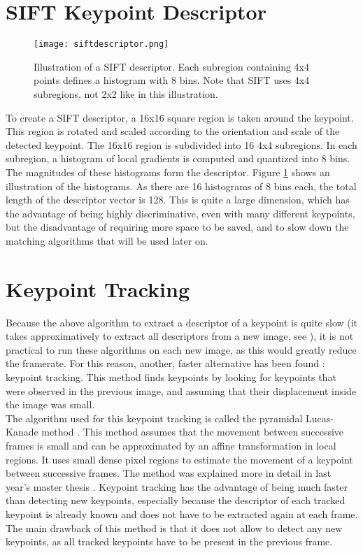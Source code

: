 \section{SIFT Keypoint Descriptor}
\begin{figure}[H]
  \centering
  \texttt{[image: siftdescriptor.png]}
    \caption{Illustration of a SIFT descriptor. Each subregion containing 4x4 points defines a histogram with 8 bins. Note that SIFT uses 4x4 subregions, not 2x2 like in this illustration. \cite{sift2}}
    \label{fig:siftdescriptor}
\end{figure}
To create a SIFT descriptor, a 16x16 square region is taken around the keypoint. This region is rotated and scaled according to the orientation and scale of the detected keypoint. The 16x16 region is subdivided into 16 4x4 subregions. In each subregion, a histogram of local gradients is computed and quantized into 8 bins. The magnitudes of these histograms form the descriptor. Figure \ref{fig:siftdescriptor} shows an illustration of the histograms. As there are 16 histograms of 8 bins each, the total length of the descriptor vector is 128. This is quite a large dimension, which has the advantage of being highly discriminative, even with many different keypoints, but the disadvantage of requiring more space to be saved, and to slow down the matching algorithms that will be used later on.
\cite{sift}

\section{Keypoint Tracking}
Because the above algorithm to extract a descriptor of a keypoint is quite slow (it takes approximatively %
to extract all descriptors from a new image, see %
), it is not practical to run these algorithms on each new image, as this would greatly reduce the framerate. For this reason, another, faster alternative has been found : keypoint tracking. This method finds keypoints by looking for keypoints that were observed in the previous image, and assuming that their displacement inside the image was small. \\
The algorithm used for this keypoint tracking is called the pyramidal Lucas-Kanade method \cite{pyramidallucaskanade}. This method assumes that the movement between successive frames is small and can be approximated by an affine transformation in local regions. It uses small dense pixel regions to estimate the movement of a keypoint between successive frames. The method was explained more in detail in last year's master thesis \cite{jacquesleclere}.
Keypoint tracking has the advantage of being much faster than detecting new keypoints, especially because the descriptor of each tracked keypoint is already known and does not have to be extracted again at each frame. The main drawback of this method is that it does not allow to detect any new keypoints, as all tracked keypoints have to be present in the previous frame.


